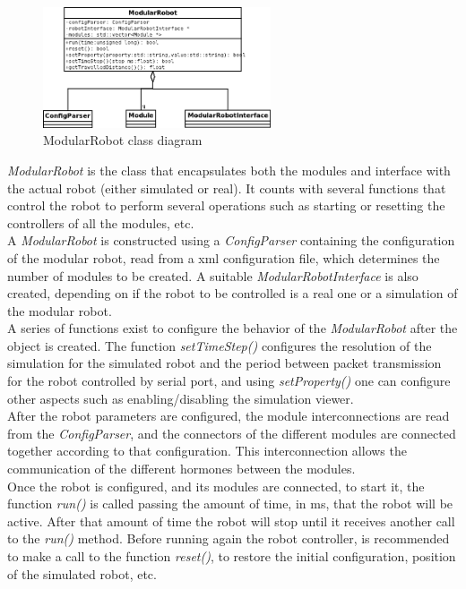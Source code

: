 \begin{figure}[h]
		\centering
        \includegraphics[width=0.6\textwidth]{images/Class_diagram_ModularRobot.png}
        \caption{ModularRobot class diagram}\label{fig:software_class_modularrobot_class}
\end{figure}


\emph{ModularRobot} is the class that encapsulates both the modules and interface with the actual robot (either simulated or real). It counts with several functions that control the robot to perform several operations such as starting or resetting the controllers of all the modules, etc.\\

A \emph{ModularRobot} is constructed using a \emph{ConfigParser} containing the configuration of the modular robot, read from a xml configuration file, which determines the number of modules to be created. A suitable \emph{ModularRobotInterface} is also created, depending on if the robot to be controlled is a real one or a simulation of the modular robot.\\

A series of functions exist to configure the behavior of the \emph{ModularRobot} after the object is created.  The function \emph{setTimeStep()} configures the resolution of the simulation for the simulated robot and the period between packet transmission for the robot controlled by serial port, and using \emph{setProperty()} one can configure other aspects such as enabling/disabling the simulation viewer.\\

After the robot parameters are configured, the module interconnections are read from the \emph{ConfigParser}, and the connectors of the different modules are connected together according to that configuration. This interconnection allows the communication of the different hormones between the modules.\\

Once the robot is configured, and its modules are connected, to start it, the function \emph{run()} is called passing the amount of time, in ms, that the robot will be active. After that amount of time the robot will stop until it receives another call to the \emph{run()} method. Before running again the robot controller, is recommended to make a call to the function \emph{reset()}, to restore the initial configuration, position of the simulated robot, etc.\\


